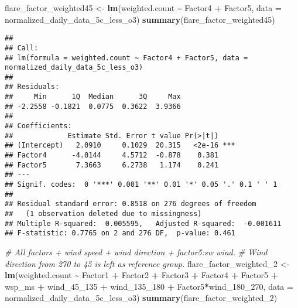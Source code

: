 \documentclass[
]{article}
\newenvironment{Shaded}{\begin{snugshade}}{\end{snugshade}}
\newcommand{\AttributeTok}[1]{\textcolor[rgb]{0.13,0.29,0.53}{#1}}
\newcommand{\CommentTok}[1]{\textcolor[rgb]{0.56,0.35,0.01}{\textit{#1}}}
\newcommand{\FunctionTok}[1]{\textcolor[rgb]{0.13,0.29,0.53}{\textbf{#1}}}
\newcommand{\NormalTok}[1]{#1}
\newcommand{\OtherTok}[1]{\textcolor[rgb]{0.56,0.35,0.01}{#1}}
\newcommand{\SpecialCharTok}[1]{\textcolor[rgb]{0.81,0.36,0.00}{\textbf{#1}}}
\begin{document}
\begin{Shaded}
\begin{Highlighting}[]
\NormalTok{flare\_factor\_weighted45 }\OtherTok{\textless{}{-}} \FunctionTok{lm}\NormalTok{(weighted.count }\SpecialCharTok{\textasciitilde{}}\NormalTok{ Factor4 }\SpecialCharTok{+}\NormalTok{ Factor5, }
                              \AttributeTok{data =}\NormalTok{ normalized\_daily\_data\_5c\_less\_o3)}
\FunctionTok{summary}\NormalTok{(flare\_factor\_weighted45)}
\end{Highlighting}
\end{Shaded}

\begin{verbatim}
## 
## Call:
## lm(formula = weighted.count ~ Factor4 + Factor5, data = normalized_daily_data_5c_less_o3)
## 
## Residuals:
##     Min      1Q  Median      3Q     Max 
## -2.2558 -0.1821  0.0775  0.3622  3.9366 
## 
## Coefficients:
##             Estimate Std. Error t value Pr(>|t|)    
## (Intercept)   2.0910     0.1029  20.315   <2e-16 ***
## Factor4      -4.0144     4.5712  -0.878    0.381    
## Factor5       7.3663     6.2738   1.174    0.241    
## ---
## Signif. codes:  0 '***' 0.001 '**' 0.01 '*' 0.05 '.' 0.1 ' ' 1
## 
## Residual standard error: 0.8518 on 276 degrees of freedom
##   (1 observation deleted due to missingness)
## Multiple R-squared:  0.005595,   Adjusted R-squared:  -0.001611 
## F-statistic: 0.7765 on 2 and 276 DF,  p-value: 0.461
\end{verbatim}

\begin{Shaded}
\begin{Highlighting}[]
\CommentTok{\# All factors + wind speed + wind direction + factor5:sw wind.}
\CommentTok{\# Wind direction from 270 to 45 is left as reference group.}
\NormalTok{flare\_factor\_weighted\_2 }\OtherTok{\textless{}{-}} \FunctionTok{lm}\NormalTok{(weighted.count }\SpecialCharTok{\textasciitilde{}}\NormalTok{ Factor1 }\SpecialCharTok{+}\NormalTok{ Factor2 }\SpecialCharTok{+}\NormalTok{ Factor3 }\SpecialCharTok{+} 
\NormalTok{                                Factor4 }\SpecialCharTok{+}\NormalTok{ Factor5 }\SpecialCharTok{+}\NormalTok{ wsp\_ms }\SpecialCharTok{+}\NormalTok{ wind\_45\_135 }\SpecialCharTok{+} 
\NormalTok{                                wind\_135\_180 }\SpecialCharTok{+}\NormalTok{ Factor5}\SpecialCharTok{*}\NormalTok{wind\_180\_270, }
                              \AttributeTok{data =}\NormalTok{ normalized\_daily\_data\_5c\_less\_o3)}
\FunctionTok{summary}\NormalTok{(flare\_factor\_weighted\_2)}
\end{Highlighting}
\end{Shaded}
\end{document}
